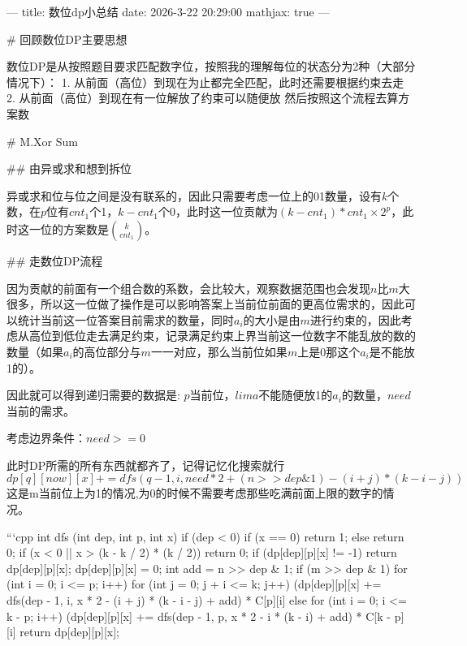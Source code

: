 ---
title: 数位dp小总结
date: 2026-3-22 20:29:00
mathjax: true
---

# 回顾数位DP主要思想

数位DP是从按照题目要求匹配数字位，按照我的理解每位的状态分为2种（大部分情况下）：  
1. 从前面（高位）到现在为止都完全匹配，此时还需要根据约束去走  
2. 从前面（高位）到现在有一位解放了约束可以随便放  
然后按照这个流程去算方案数

# M.Xor Sum

## 由异或求和想到拆位

异或求和位与位之间是没有联系的，因此只需要考虑一位上的01数量，设有$k$个数，在$p$位有$cnt_1$个1，$k-cnt_1$个0，此时这一位贡献为$(k-cnt_1)*cnt_1 \times 2^{p}$，此时这一位的方案数是$\binom{k}{cnt_1}$。

## 走数位DP流程

因为贡献的前面有一个组合数的系数，会比较大，观察数据范围也会发现$n$比$m$大很多，所以这一位做了操作是可以影响答案上当前位前面的更高位需求的，因此可以统计当前这一位答案目前需求的数量，同时$a_i$的大小是由$m$进行约束的，因此考虑从高位到低位走去满足约束，记录满足约束上界当前这一位数字不能乱放的数的数量（如果$a_i$的高位部分与$m$一一对应，那么当前位如果$m$上是0那这个$a_i$是不能放1的）。

因此就可以得到递归需要的数据是: $p$当前位，$lima$不能随便放1的$a_i$的数量，$need$当前的需求。

考虑边界条件：$need>=0$

此时DP所需的所有东西就都齐了，记得记忆化搜索就行
$$
dp[q][now][x] += dfs(q - 1, i, need * 2 + (n >> dep \& 1) - (i + j) * (k - i - j))
$$
这是m当前位上为1的情况,为0的时候不需要考虑那些吃满前面上限的数字的情况。

```cpp
int dfs (int dep, int p, int x) {
    if (dep < 0) {
        if (x == 0) return 1;
        else return 0;
    }
    if (x < 0 || x > (k - k / 2) * (k / 2)) return 0;
    if (dp[dep][p][x] != -1) return dp[dep][p][x];
    dp[dep][p][x] = 0;
    int add = n >> dep & 1;
    if (m >> dep & 1) {
        for (int i = 0; i <= p; i++) {
            for (int j = 0; j + i <= k; j++) {
                (dp[dep][p][x] += dfs(dep - 1, i, x * 2 - (i + j) * (k - i - j) + 
                add) * C[p][i] %
            }
        }
    } else {
        for (int i = 0; i <= k - p; i++) {
            (dp[dep][p][x] += dfs(dep - 1, p, x * 2 - i * (k - i) + add) * C[k - p]
            [i] %
        }
    }
    return dp[dep][p][x];
}